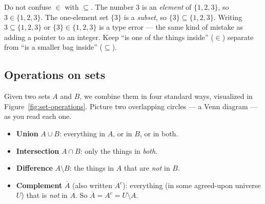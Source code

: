\begin{trapbox}
Do not confuse $\in$ with $\subseteq$. The number $3$ is an \emph{element} of
$\{1,2,3\}$, so $3 \in \{1,2,3\}$. The one-element set $\{3\}$ is a \emph{subset},
so $\{3\} \subseteq \{1,2,3\}$. Writing $3 \subseteq \{1,2,3\}$ or
$\{3\} \in \{1,2,3\}$ is a type error --- the same kind of mistake as adding a
pointer to an integer. Keep ``is one of the things inside'' ($\in$) separate from
``is a smaller bag inside'' ($\subseteq$).
\end{trapbox}

\subsection{Operations on sets}

Given two sets $A$ and $B$, we combine them in four standard ways, visualized in Figure~\ref{fig:set-operations}. Picture two
overlapping circles --- a Venn diagram --- as you read each one.

\begin{itemize}
\item \textbf{Union} $A \cup B$: everything in $A$, or in $B$, or in both.
\item \textbf{Intersection} $A \cap B$: only the things in \emph{both}.
\item \textbf{Difference} $A \setminus B$: the things in $A$ that are \emph{not} in $B$.
\item \textbf{Complement} $\overline{A}$ (also written $A^c$): everything (in some agreed-upon universe $U$)
that is \emph{not} in $A$. So $\overline{A} = A^c = U \setminus A$.
\end{itemize}

